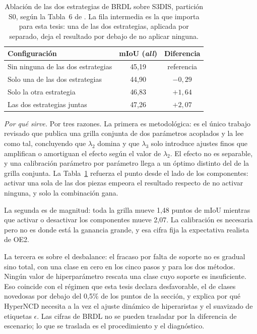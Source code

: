 \begin{table}[htbp]
\centering
\caption{Ablación de las dos estrategias de BRDL sobre S3DIS, partición S0,
según la Tabla~6 de \cite{su2025brdl}. La fila intermedia es la que importa para
esta tesis: una de las dos estrategias, aplicada por separado, deja el resultado
por debajo de no aplicar ninguna.}
\label{tab:ablacion-brdl}
\begin{tabular}{@{}p{6.3cm}cc@{}}
\hline
Configuración & mIoU (\emph{all}) & Diferencia \\
\hline
Sin ninguna de las dos estrategias & 45,19 & referencia \\
Solo una de las dos estrategias & 44,90 & $-0{,}29$ \\
Solo la otra estrategia & 46,83 & $+1{,}64$ \\
Las dos estrategias juntas & 47,26 & $+2{,}07$ \\
\hline
\end{tabular}
\end{table}

\emph{Por qué sirve.} Por tres razones. La primera es metodológica: es el único
trabajo revisado que publica una grilla conjunta de dos parámetros acoplados y la
lee como tal, concluyendo que $\lambda_2$ domina y que $\lambda_3$ solo introduce
ajustes finos que amplifican o amortiguan el efecto según el valor de
$\lambda_2$. El efecto no es separable, y una calibración parámetro por parámetro
llega a un óptimo distinto del de la grilla conjunta. La
Tabla~\ref{tab:ablacion-brdl} refuerza el punto desde el lado de los
componentes: activar una sola de las dos piezas empeora el resultado respecto de
no activar ninguna, y solo la combinación gana.

La segunda es de magnitud: toda la grilla mueve 1,48 puntos de mIoU mientras que
activar o desactivar los componentes mueve 2,07. La calibración es necesaria pero
no es donde está la ganancia grande, y esa cifra fija la expectativa realista de
OE2.

La tercera es sobre el desbalance: el fracaso por falta de soporte no es gradual
sino total, con una clase en cero en los cinco pasos y para los dos métodos.
Ningún valor de hiperparámetro rescata una clase cuyo soporte es insuficiente.
Eso coincide con el régimen que esta tesis declara desfavorable, el de clases
novedosas por debajo del 0,5\% de los puntos de la sección, y explica por qué
HyperNCD necesita a la vez el ajuste dinámico de hiperaristas y el suavizado de
etiquetas $\epsilon$. Las cifras de BRDL no se pueden trasladar por la diferencia
de escenario; lo que se traslada es el procedimiento y el diagnóstico.

